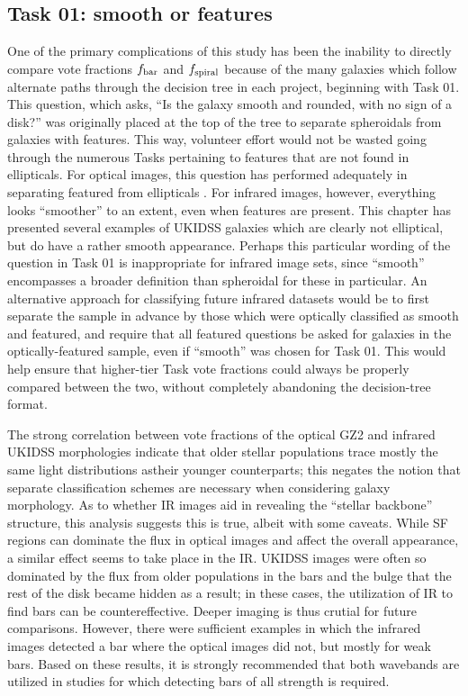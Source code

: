 \subsection{Task 01: smooth or features} 
\label{ssec:smooth}
One of the primary complications of this study has been the inability to directly compare vote fractions $f_{\rm bar}$ and $f_{\rm spiral}$ because of the many galaxies which follow alternate paths through the decision tree in each project, beginning with Task 01. This question, which asks, ``Is the galaxy smooth and rounded, with no sign of a disk?'' was originally placed at the top of the tree to separate spheroidals from galaxies with features. This way, volunteer effort would not be wasted going through the numerous Tasks pertaining to features that are not found in ellipticals. For optical images, this question has performed adequately in separating featured from ellipticals \citet{Willett2013}. For infrared images, however, everything looks ``smoother'' to an extent, even when features are present. This chapter has presented several examples of UKIDSS galaxies which are clearly not elliptical, but do have a rather smooth appearance. Perhaps this particular wording of the question in Task 01 is inappropriate for infrared image sets, since ``smooth'' encompasses a broader definition than spheroidal for these in particular. An alternative approach for classifying future infrared datasets would be to first separate the sample in advance by those which were optically classified as smooth and featured, and require that all featured questions be asked for galaxies in the optically-featured sample, even if ``smooth'' was chosen for Task 01. This would help ensure that higher-tier Task vote fractions could always be properly compared between the two, without completely abandoning the decision-tree format.   

The strong correlation between vote fractions of the optical GZ2 and infrared UKIDSS morphologies indicate that older stellar populations trace mostly the same light distributions astheir younger counterparts; this negates the notion \citep{Block1999} that separate classification schemes are necessary when considering galaxy morphology. As to whether IR images aid in revealing the ``stellar backbone'' structure, this analysis suggests this is true, albeit with some caveats. While SF regions can dominate the flux in optical images and affect the overall appearance, a similar effect seems to take place in the IR. UKIDSS images were often so dominated by the flux from older populations in the bars and the bulge that the rest of the disk became hidden as a result; in these cases, the utilization of IR to find bars can be countereffective. Deeper imaging is thus crutial for future comparisons. However, there were sufficient examples in which the infrared images detected a bar where the optical images did not, but mostly for weak bars. Based on these results, it is strongly recommended that both wavebands are utilized in studies for which detecting bars of all strength is required. 

